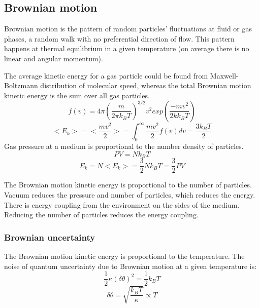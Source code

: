 \documentclass[\main/master.tex]{subfiles}
\begin{document}
\subsection{Brownian motion}
Brownian motion is the pattern of random particles' fluctuations at fluid or gas phases, a random walk with no preferential direction of flow. This pattern happens at thermal equilibrium in a given temperature (on average there is no linear and angular momentum). 
\par\noindent
The average kinetic energy for a gas particle could be found from Maxwell-Boltzmann distribution of molecular speed, whereas the total Brownian motion kinetic energy is the sum over all gas particles.
\begin{equation}
f(v) = 4\pi(\frac{m}{2\pi k_BT})^{3/2}v^2exp(\frac{-mv^2}{2kk_BT})     \label{eqn:Maxwell_Boltzmann}
\end{equation}  
\begin{equation}
<E_k>=<\frac{mv^2}{2}> = \int_{0}^{\infty}\frac{mv^2}{2}f(v)dv =  \frac{3k_BT}{2}    \label{eqn:average_kinetic}
\end{equation}
Gas pressure at a medium is proportional to the number density of particles.    
\begin{equation}
PV = N k_B T  \label{eqn:ideal-gasses}
\end{equation}
\begin{equation}
E_k=N<E_k> =\frac{3}{2}N k_B T = \frac{3}{2}PV    \label{eqn:total_kinetic}
\end{equation}

\noindent
The Brownian motion kinetic energy is proportional to the number of particles. Vacuum reduces the pressure and number of particles, which reduces the energy. There is energy coupling from the environment on the sides of the medium. Reducing the number of particles reduces the energy coupling.
\subsubsection{Brownian uncertainty}
The Brownian motion kinetic energy is proportional to the temperature. The noise of quantum uncertainty due to Brownian motion at a given temperature is: 
\begin{equation}
\frac{1}{2}\kappa (\delta\theta)^2= \frac{1}{2}k_BT  \label{eqn:radiation force}
\end{equation}
\begin{equation}
\delta\theta = \sqrt{\frac{k_BT}{\kappa}}\propto{T}  \label{eqn:radiation force}
\end{equation}
\end{document}
